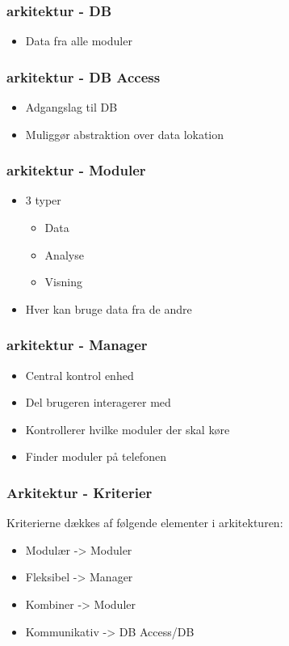 \begin{frame}
\frametitle{arkitektur - DB}
\begin{itemize}
\item Data fra alle moduler
\end{itemize}
\end{frame}

\begin{frame}
\frametitle{arkitektur - DB Access}
\begin{itemize}
\item Adgangslag til DB
\item Muliggør abstraktion over data lokation
\end{itemize}
\end{frame}

\begin{frame}
\frametitle{arkitektur - Moduler}
\begin{itemize}
\item 3 typer
\begin{itemize}
\item Data
\item Analyse
\item Visning
\end{itemize}
\item Hver kan bruge data fra de andre
\end{itemize}
\end{frame}

\begin{frame}
\frametitle{arkitektur - Manager}
\begin{itemize}
\item Central kontrol enhed
\item Del brugeren interagerer med
\item Kontrollerer hvilke moduler der skal køre
\item Finder moduler på telefonen
\end{itemize}
\end{frame}

\begin{frame}
\frametitle{Arkitektur - Kriterier}
Kriterierne dækkes af følgende elementer i arkitekturen:
\begin{itemize}
\item Modulær -> Moduler
\item Fleksibel -> Manager
\item Kombiner -> Moduler
\item Kommunikativ -> DB Access/DB
\end{itemize}
\end{frame}


